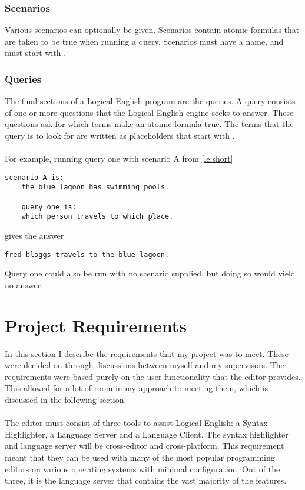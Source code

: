 \documentclass[../main.tex]{subfiles}
\begin{document}
\subsubsection{Scenarios}
Various scenarios can optionally be given. Scenarios contain atomic formulas that are taken to be true when running a query. Scenarios must have a name, and must start with 
. 

\subsubsection{Queries}
The final sections of a Logical English program are the queries. A query consists of one or more questions that the Logical English engine seeks to answer. These questions ask for which terms make an atomic formula true. The terms that the query is to look for are written as placeholders that start with . 
\\
\\
For example, running query one with scenario A from \ref{le:short}
\begin{lstlisting}[language={LE}]
    scenario A is:
    the blue lagoon has swimming pools.

    query one is:
    which person travels to which place.
\end{lstlisting}
gives the answer
\begin{lstlisting}[language={LE}]
    fred bloggs travels to the blue lagoon.
\end{lstlisting}
Query one could also be run with no scenario supplied, but doing so would yield no answer.

\newpage
\section{Project Requirements}
In this section I describe the requirements that my project was to meet. These were decided on through discussions between myself and my supervisors. The requirements were based purely on the user functionality that the editor provides. This allowed for a lot of room in my approach to meeting them, which is discussed in the following section.
\\
\\
The editor must consist of three tools to assist Logical English: a Syntax Highlighter, a Language Server and a Language Client. The syntax highlighter and language server will be cross-editor and cross-platform. This requirement meant that they can be used with many of the most popular programming editors on various operating systems with minimal configuration. Out of the three, it is the language server that contains the vast majority of the features.
\end{document}
